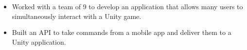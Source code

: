 
\begin{itemize}
    \item Worked with a team of 9 to develop an application that allows many users to simultaneously interact with a Unity game.
    \item Built an API to take commands from a mobile app and deliver them to a Unity application.
\end{itemize}